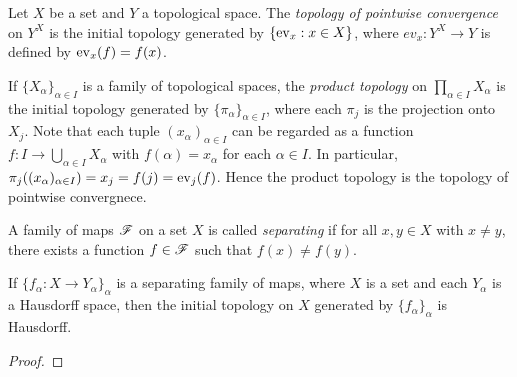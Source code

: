 \begin{example}
	Let $X$ be a set and $Y$ a topological space. The \emph{topology of pointwise convergence} on $Y^X$ is the initial topology generated by $\{\operatorname{ev}_x : x \in X\}$, where $ev_x:Y^X \rightarrow Y$ is defined by $\operatorname{ev}_x(f) = f(x)$. 
\end{example}

\begin{example}
	If $\{X_\alpha\}_{\alpha \in I}$ is a family of topological spaces, the \emph{product topology} on $\prod_{\alpha \in I}X_\alpha$ is the initial topology generated by $\{\pi_\alpha\}_{\alpha \in I}$, where each $\pi_j$ is the projection onto $X_j$. Note that each tuple $(x_\alpha)_{\alpha \in I}$ can be regarded as a function $f:I \rightarrow \bigcup_{\alpha \in I}X_\alpha$ with $f(\alpha) = x_\alpha$ for each $\alpha \in I$. In particular, $\pi_j((x_\alpha)_{\alpha \in I}) = x_j = f(j) = \operatorname{ev}_j(f)$. Hence the product topology is the topology of pointwise convergnece.
\end{example}

\begin{definition}
	A family of maps $\mathscr{F}$ on a set $X$ is called \emph{separating} if for all $x,y \in X$ with $x \neq y$, there exists a function $f \in \mathscr{F}$ such that $f(x) \neq f(y)$.
\end{definition}

\begin{proposition}
	If $\{f_\alpha:X \rightarrow Y_\alpha\}_\alpha$ is a separating family of maps, where $X$ is a set and each $Y_\alpha$ is a Hausdorff space, then the initial topology on $X$ generated by $\{f_\alpha\}_\alpha$ is Hausdorff.
\end{proposition}
	{\color{red}
	\begin{proof}
			
	\end{proof}}


